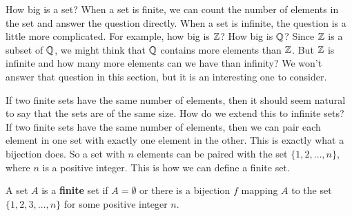 \begin{comment}

\ActivitySolution We will show that $(g \circ f)^{-1}(C)=f^{-1}(g^{-1}(C))$. Let $x \in (g \circ f)^{-1}(C)$. Then $(g \circ f)(x) \in C$. So $g(f(x)) \in C$ and $f(x) \in g^{-1}(C)$. From this it follows that $x \in f^{-1}(g^{-1}(C))$. So $(g \circ f)^{-1}(C) \subseteq f^{-1}(g^{-1}(C))$. 

Now assume that $x \in f^{-1}(g^{-1}(C))$. Then $f(x) \in g^{-1}(C)$. We then have $g(f(x)) \in C$ or $(g \circ f)(x) \in C$. Thus, $x \in (g \circ f)^{-1}(C)$ and $f^{-1}(g^{-1}(C)) \subseteq (g \circ f)^{-1}(C)$. The two containments demonstrate that $f^{-1}(g^{-1}(C)) = (g \circ f)^{-1}(C)$.

\end{comment}


How big is a set? When a set is finite, we can count the number of elements in the set and answer the question directly. When a set is infinite, the question is a little more complicated. For example, how big is $\mathbb{Z}$? How big is $\mathbb{Q}$? Since $\mathbb{Z}$ is a subset of $\mathbb{Q}$, we might think that $\mathbb{Q}$ contains more elements than $\mathbb{Z}$. But $\mathbb{Z}$ is infinite and how many more elements can we have than infinity? We won't answer that question in this section, but it is an interesting one to consider. 

If two finite sets have the same number of elements, then it should seem natural to say that the sets are of the same size. How do we extend this to infinite sets? If two finite sets have the same number of elements, then we can pair each element in one set with exactly one element in the other. This is exactly what a bijection does.  So a set with $n$ elements can be paired with the set $\{1, 2, \ldots, n\}$, where $n$ is a positive integer. This is how we can define a finite set. 

\begin{definition} A set $A$ is a \textbf{finite} set if $A = \emptyset$ or there is a bijection $f$ mapping $A$ to the set $\{1,2,3, \ldots, n\}$ for some positive integer $n$. 
\end{definition}

